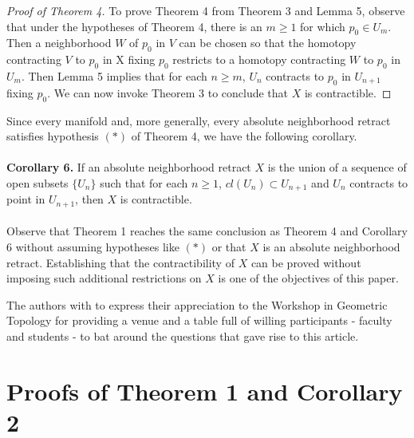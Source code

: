 \documentclass[12pt]{amsart}%
\theoremstyle{plain}
\numberwithin{equation}{section}
\begin{document}
\begin{proof}[Proof of Theorem 4]
To prove Theorem 4 from Theorem 3 and Lemma 5, observe that under the hypotheses of Theorem 4, there is an $m \geq 1$ for which $p_0 \in U_m$.  Then a neighborhood $W$ of $p_0$ in $V$ can be chosen so that the homotopy contracting $V$ to $p_0$ in X fixing $p_0$ restricts to a homotopy contracting $W$ to $p_0$ in $U_m$.  Then Lemma 5 implies that for each $n \geq m$, $U_n$ contracts to $p_0$ in $U_{n+1}$ fixing $p_0$.  We can now invoke Theorem 3 to conclude that $X$ is contractible.
\end{proof}

\indent Since every manifold and, more generally, every absolute neighborhood retract 
satisfies hypothesis $( \ast )$ of Theorem 4, we have the following corollary.
\\\\
\textbf{Corollary 6.} If an absolute neighborhood retract $X$ is the union of a sequence of open subsets $\{U_n\}$ such that for each $n \geq 1$, $cl(U_n) \subset U_{n+1}$ and $U_n$ contracts to point in $U_{n+1}$, then $X$ is contractible.
\\\\
\indent Observe that Theorem 1 reaches the same conclusion as Theorem 4 and Corollary 6 without assuming hypotheses like $( \ast )$ or that $X$ is an absolute neighborhood retract.  Establishing that the contractibility of $X$ can be proved without imposing such additional restrictions on $X$ is one of the objectives of this paper. 

\indent The authors with to express their appreciation to the Workshop in Geometric Topology for providing a venue and a table full of willing participants - faculty and students - to bat around the questions that gave rise to this article.\\

\section{Proofs of Theorem 1 and Corollary 2}
\end{document}

